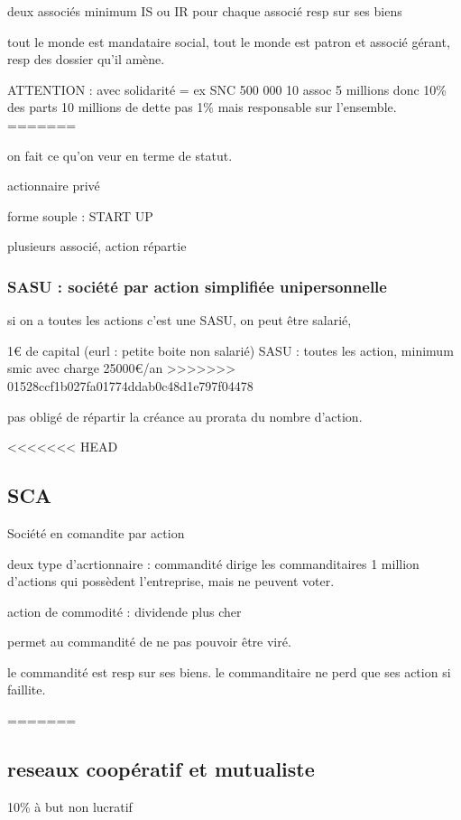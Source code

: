 \documentclass[a4paper,12pt]{article}
\begin{document}
deux associés minimum
IS ou IR pour chaque associé
resp sur ses biens 

tout le monde est mandataire social, tout le monde est patron et associé gérant,
resp des dossier qu'il amène.


ATTENTION : avec solidarité = ex SNC 500 000 10 assoc 5 millions donc 10\% des parts
10 millions de dette pas 1\% mais responsable sur l'ensemble.
=======

on fait ce qu'on veur en terme de statut.

actionnaire privé

forme souple : START UP

plusieurs associé, action répartie

 \subsubsection{SASU : société par action simplifiée unipersonnelle}

si on a toutes les actions c'est une SASU, on peut être salarié,

1€ de capital (eurl : petite boite non salarié)
SASU : toutes les action, minimum smic avec charge 25000€/an
>>>>>>> 01528ccf1b027fa01774ddab0c48d1e797f04478

pas obligé de répartir la créance au prorata du nombre d'action.

<<<<<<< HEAD

\subsection{SCA}

Société en comandite par action

deux type d'acrtionnaire : commandité dirige
les commanditaires 1 million d'actions qui possèdent l'entreprise,
mais ne peuvent voter.

action de commodité : dividende plus cher

permet au commandité de ne pas pouvoir être viré.


le commandité est resp sur ses biens.
le commanditaire ne perd que ses action si faillite.


=======
\subsection{reseaux coopératif et mutualiste}

10\% à but non lucratif
\end{document}
